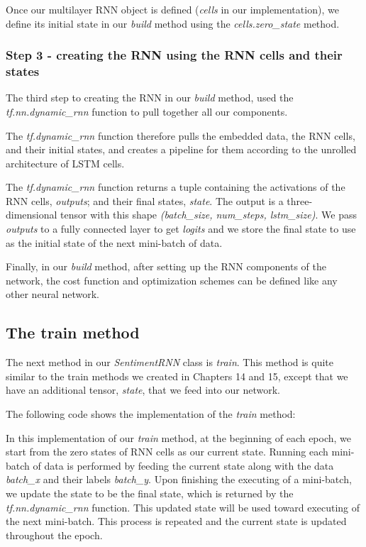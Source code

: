 \documentclass[11pt]{article}
\begin{document}
Once our multilayer RNN object is defined (\emph{cells} in our
implementation), we define its initial state in our \emph{build} method
using the \emph{cells.zero\_state} method.

    \subsubsection{Step 3 - creating the RNN using the RNN cells and their
states}\label{step-3---creating-the-rnn-using-the-rnn-cells-and-their-states}

    The third step to creating the RNN in our \emph{build} method, used the
\emph{tf.nn.dynamic\_rnn} function to pull together all our components.

The \emph{tf.dynamic\_rnn} function therefore pulls the embedded data,
the RNN cells, and their initial states, and creates a pipeline for them
according to the unrolled architecture of LSTM cells.

The \emph{tf.dynamic\_rnn} function returns a tuple containing the
activations of the RNN cells, \emph{outputs}; and their final states,
\emph{state}. The output is a three-dimensional tensor with this shape
\emph{(batch\_size, num\_steps, lstm\_size)}. We pass \emph{outputs} to
a fully connected layer to get \emph{logits} and we store the final
state to use as the initial state of the next mini-batch of data.

Finally, in our \emph{build} method, after setting up the RNN components
of the network, the cost function and optimization schemes can be
defined like any other neural network.

    \subsection{The train method}\label{the-train-method}

    The next method in our \emph{SentimentRNN} class is \emph{train}. This
method is quite similar to the train methods we created in Chapters 14
and 15, except that we have an additional tensor, \emph{state}, that we
feed into our network.

The following code shows the implementation of the \emph{train} method:

In this implementation of our \emph{train} method, at the beginning of
each epoch, we start from the zero states of RNN cells as our current
state. Running each mini-batch of data is performed by feeding the
current state along with the data \emph{batch\_x} and their labels
\emph{batch\_y}. Upon finishing the executing of a mini-batch, we update
the state to be the final state, which is returned by the
\emph{tf.nn.dynamic\_rnn} function. This updated state will be used
toward executing of the next mini-batch. This process is repeated and
the current state is updated throughout the epoch.
\end{document}
